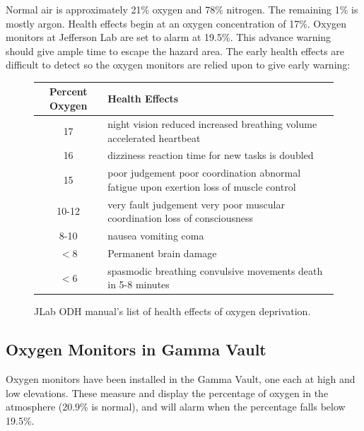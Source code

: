 Normal air is approximately 21\% oxygen and 78\% nitrogen. The remaining 1\% is mostly argon. Health effects begin at an oxygen concentration of 17\%. Oxygen monitors at Jefferson Lab are set to alarm at 19.5\%. This advance warning should give ample time to escape the hazard area.  The early health effects are difficult to detect so the oxygen monitors are relied upon to give early warning:

\begin{figure}
\centering
\begin{tabular}{|c|p{6cm}|}
 \hline
Percent Oxygen & Health Effects \\
\hline
17 & night vision reduced \newline increased breathing volume \newline accelerated heartbeat \\
\hline
16 & dizziness \newline reaction time for new tasks is doubled\\
\hline
15 & poor judgement \newline poor coordination \newline abnormal fatigue upon exertion \newline loss of muscle control\\
\hline
10-12 & very fault judgement \newline very poor muscular coordination \newline loss of consciousness\\
\hline
8-10& nausea \newline vomiting \newline coma\\
\hline
$<$8 & Permanent brain damage \\
\hline
$<$6 & spasmodic breathing \newline convulsive movements \newline death in 5-8 minutes \\
\hline
\end{tabular} 
\caption{JLab ODH manual's list of health effects of oxygen deprivation.}
\label{fig:jlabodh}
\end{figure}

\subsection{Oxygen Monitors in Gamma Vault\cite{wallace-odh}}
Oxygen monitors have been installed in the Gamma Vault, one each at high and low elevations.  These measure and display the percentage of oxygen in the atmosphere (20.9\% is normal), and will alarm when the percentage falls below 19.5\%.

